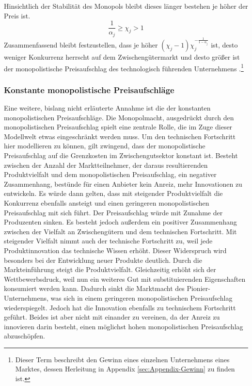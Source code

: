 Hinsichtlich der Stabilität des Monopols bleibt dieses länger bestehen je höher der Preis ist. 
\begin{equation} \frac{1}{\alpha_j}\geq\chi_j>1\end{equation}
Zusammenfassend bleibt festzustellen, dass je höher $(\chi_j-1)\chi_j^{-\frac{1}{1-\alpha_j}}$ ist, desto weniger Konkurrenz herrscht auf dem Zwischengütermarkt und desto grö{\ss}er ist der monopolistische  Preisaufschlag des technologisch führenden Unternehmens \citep{Acemoglu.2006}.\footnote{Dieser Term beschreibt den Gewinn eines einzelnen Unternehmens eines Marktes, dessen Herleitung in Appendix \ref{sec:Appendix-Gewinn} zu finden ist.} 



\subsubsection{Konstante monopolistische Preisaufschläge}
Eine weitere, bislang nicht erläuterte Annahme ist die der konstanten monopolistischen Preisaufschläge. Die Monopolmacht, ausgedrückt durch den monopolistischen Preisaufschlag spielt eine zentrale Rolle, die im Zuge dieser Modellwelt etwas eingeschränkt werden muss. Um den technischen Fortschritt hier modellieren zu können, gilt zwingend, dass der monopolistische Preisaufschlag auf die Grenzkosten im Zwischengutsektor konstant ist. Besteht zwischen der Anzahl der Marktteilnehmer, der daraus resultierenden Produktvielfalt und dem monopolistischen Preisaufschlag, ein negativer Zusammenhang, bestünde für einen Anbieter kein Anreiz, mehr Innovationen zu entwickeln. Es würde dann gelten, dass mit steigender Produktvielfalt die Konkurrenz ebenfalls ansteigt und einen geringeren monopolistischen Preisaufschlag mit sich führt. Der Preisaufschlag würde mit Zunahme der Produzenten sinken. Es besteht jedoch au{\ss}erdem ein positiver Zusammenhang zwischen der Vielfalt an Zwischengütern und dem technischen Fortschritt. Mit steigender Vielfalt nimmt auch der technische Fortschritt zu, weil jede Produktinnovation das technische Wissen erhöht. Dieser Widerspruch wird besonders bei der Entwicklung neuer Produkte deutlich. Durch die Markteinführung steigt die Produktvielfalt. Gleichzeitig erhöht sich der Wettbewerbsdruck, weil nun ein weiteres Gut mit substituierenden Eigenschaften konsumiert werden kann. Dadurch sinkt die Marktmacht des Pionier-Unternehmens, was sich in einem geringeren monopolistischen Preisaufschlag wiederspiegelt. Jedoch hat die Innovation ebenfalls zu technischem Fortschritt geführt. Beides ist aber nicht mit einander zu vereinen, da der Anreiz zu innovieren darin besteht, einen möglichst hohen monopolistischen Preisaufschlag abzuschöpfen. \\


